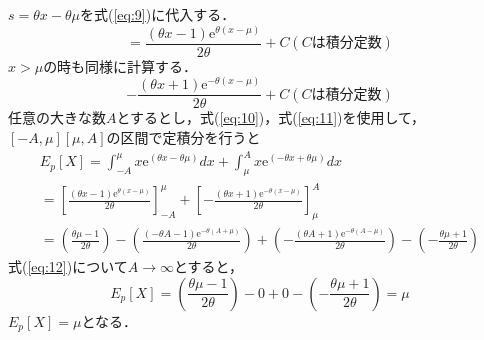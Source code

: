 \documentclass[uplatex,b5j]{jsarticle} %
\begin{document}
$s=\theta x -\theta \mu$を式(\ref{eq:9})に代入する．
\begin{equation}
    =\frac{(\theta x-1)\mathrm{e}^{\theta(x-\mu)}}{2\theta} + C (Cは積分定数) \label{eq:10}
\end{equation}
$x>\mu$の時も同様に計算する．
\begin{equation}
    -\frac{(\theta x+1)\mathrm{e}^{-\theta(x-\mu)}}{2\theta} + C (Cは積分定数) \label{eq:11}
\end{equation}
任意の大きな数$A$とするとし，式(\ref{eq:10})，式(\ref{eq:11})を使用して，$[-A,\mu][\mu,A]$の区間で定積分を行うと
\begin{eqnarray} \label{eq:12}
    E_p[X]=\int_{-A}^{\mu}x\mathrm{e}^{(\theta x -\theta \mu)} dx + \int_{\mu}^{A}x\mathrm{e}^{(-\theta x +\theta \mu)} dx \\ \nonumber
    =\left[\frac{(\theta x-1)\mathrm{e}^{\theta(x-\mu)}}{2\theta}\right]_{-A}^{\mu} + \left[-\frac{(\theta x+1)\mathrm{e}^{-\theta(x-\mu)}}{2\theta}\right]_{\mu}^{A} \\ \nonumber
    = \left(\frac{\theta \mu-1}{2\theta}\right) - \left(\frac{(-\theta A-1)\mathrm{e}^{-\theta(A+\mu)}}{2\theta}\right) + \left(-\frac{(\theta A+1)\mathrm{e}^{-\theta(A-\mu)}}{2\theta}\right) - \left(-\frac{\theta \mu+1}{2\theta}\right)
\end{eqnarray}
式(\ref{eq:12})について$A \to \infty$とすると，
\begin{equation}
    E_p[X] = \left(\frac{\theta \mu-1}{2\theta}\right) - 0 + 0 - \left(-\frac{\theta \mu+1}{2\theta}\right)
    = \mu \label{eq:13}
\end{equation}
$E_p[X] = \mu$となる．
\end{document}
